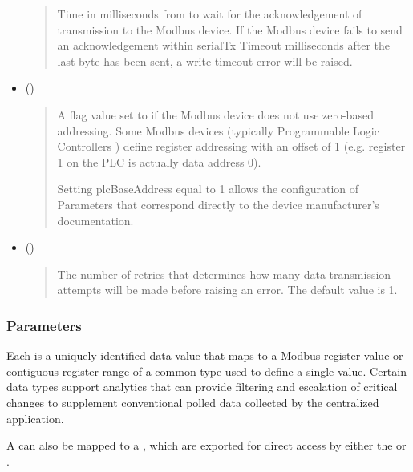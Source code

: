 \documentclass[letterpaper,10pt,english]{sphinxmanual}
\begin{document}
\begin{itemize}
\begin{quote}
Time in milliseconds from  to wait for the acknowledgement of transmission to the Modbus device.
If the Modbus device fails to send an acknowledgement within serialTx Timeout milliseconds after the last byte has been sent, a write timeout error will be raised.
\end{quote}

\item {} 
 ()
\begin{quote}

A flag value set to  if the Modbus device does not use zero-based addressing.
Some Modbus devices (typically Programmable Logic Controllers ) define register addressing with an offset of 1 (e.g. register 1 on the PLC is actually data address 0).

Setting plcBaseAddress equal to 1 allows the configuration of Parameters that correspond directly to the device manufacturer’s documentation.
\end{quote}

\item {} 
 ()
\begin{quote}

The number of retries  that determines how many data transmission attempts will be made before raising an error. The default value is 1.
\end{quote}

\end{itemize}


\subsubsection{Parameters}
\label{\detokenize{configuration:parameters}}\label{\detokenize{configuration:id3}}
Each  is a uniquely identified data value that maps to a Modbus register value or contiguous register range of a common type used to define a single value.
Certain data types support analytics that can provide filtering and escalation of critical changes to supplement conventional polled data collected by the centralized application.

A  can also be mapped to a  {\hyperref[\detokenize{configuration:properties}]{}}, which are exported for direct access by either the  or .
\end{document}
